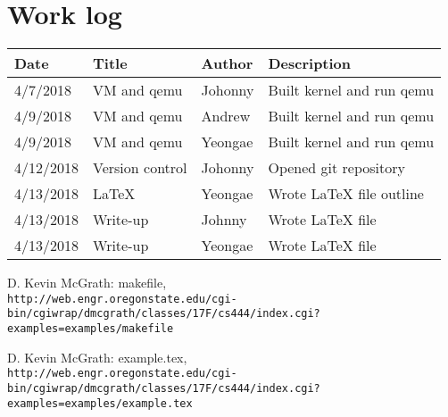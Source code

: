 \documentclass[10pt, letterpaper]{article}
\begin{document}
\section{Work log}

    \begin{tabular}{l l l l }
        \hline
         Date & Title & Author & Description \\
        \hline
         4/7/2018 & VM and qemu & Johonny & Built kernel and run qemu \\
         4/9/2018 & VM and qemu & Andrew & Built kernel and run qemu \\
         4/9/2018 & VM and qemu & Yeongae & Built kernel and run qemu \\
         4/12/2018 & Version control & Johonny & Opened git repository \\
         4/13/2018 & LaTeX & Yeongae & Wrote LaTeX file outline\\
         4/13/2018 & Write-up & Johnny & Wrote LaTeX file \\
         4/13/2018 & Write-up & Yeongae & Wrote LaTeX file \\
        \hline
    \end{tabular}
    

\begin{thebibliography}{9}
 
    D. Kevin McGrath: makefile,
    \\\texttt{http://web.engr.oregonstate.edu/cgi-bin/cgiwrap/dmcgrath/classes/17F/cs444/index.cgi?
    \\examples=examples/makefile}
  
    D. Kevin McGrath: example.tex,
    \\\texttt{http://web.engr.oregonstate.edu/cgi-bin/cgiwrap/dmcgrath/classes/17F/cs444/index.cgi?
    \\examples=examples/example.tex}

\end{thebibliography}
\end{document}
